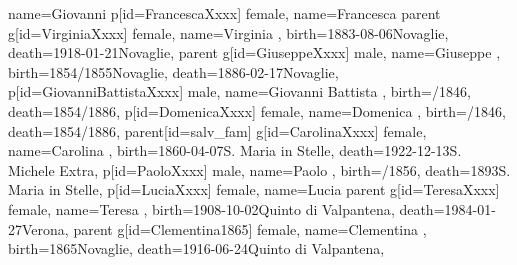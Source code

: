 \documentclass{article}
\begin{document}
\begin{midpage}
\begin{center}
\begin{genealogypicture}
{{{{{{{{                                name={Giovanni }
                            }
                            p[id=FrancescaXxxx]{
                                female,
                                name={Francesca}
                            }
                        }
                    }
                }
            }
            parent{
                g[id=VirginiaXxxx]{
                    female,
                    name={Virginia },
                    birth={1883-08-06}{Novaglie},
                    death={1918-01-21}{Novaglie},
                }
                parent{
                    g[id=GiuseppeXxxx]{
                        male,
                        name={Giuseppe },
                        birth={1854/1855}{Novaglie},
                        death={1886-02-17}{Novaglie},
                    }
                    p[id=GiovanniBattistaXxxx]{
                        male,
                        name={Giovanni Battista },
                        birth={/1846}{},
                        death={1854/1886}{},
                    }
                    p[id=DomenicaXxxx]{
                        female,
                        name={Domenica },
                        birth={/1846}{},
                        death={1854/1886}{},
                    }
                }
                parent[id=salv_fam]{
                    g[id=CarolinaXxxx]{
                        female,
                        name={Carolina },
                        birth={1860-04-07}{S. Maria in Stelle},
                        death={1922-12-13}{S. Michele Extra},
                    }
                    p[id=PaoloXxxx]{
                        male,
                        name={Paolo },
                        birth={/1856}{},
                        death={1893}{S. Maria in Stelle},
                    }
                    p[id=LuciaXxxx]{
                        female,
                        name={Lucia }
                    }
                }
            }
        }
        parent{
            g[id=TeresaXxxx]{
                female,
                name={Teresa },
                birth={1908-10-02}{Quinto di Valpantena},
                death={1984-01-27}{Verona},
            }
            parent{
                g[id=Clementina1865]{
                    female,
                    name={Clementina },
                    birth={1865}{Novaglie},
                    death={1916-06-24}{Quinto di Valpantena},
}}}}}
\end{genealogypicture}
\end{center}
\end{midpage}
\end{document}

